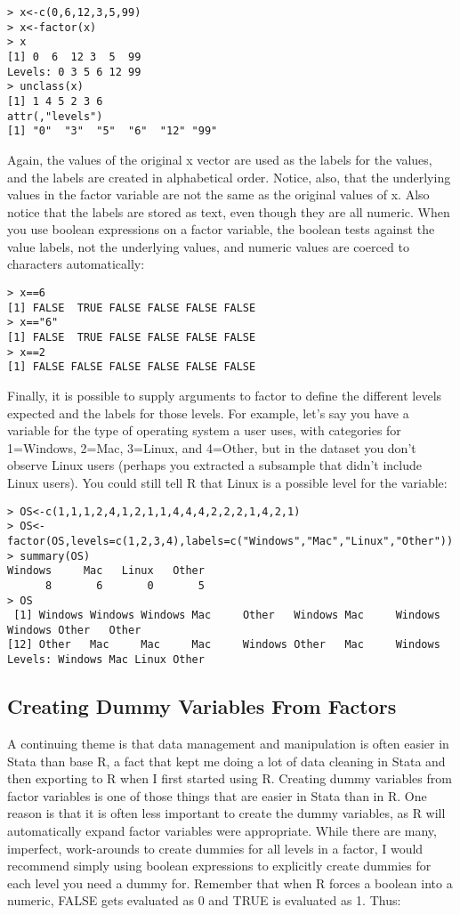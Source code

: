 \documentclass[12pt, oneside]{amsart}   	%
\begin{document}
\begin{verbatim}
> x<-c(0,6,12,3,5,99)
> x<-factor(x)
> x
[1] 0  6  12 3  5  99
Levels: 0 3 5 6 12 99
> unclass(x)
[1] 1 4 5 2 3 6
attr(,"levels")
[1] "0"  "3"  "5"  "6"  "12" "99"
\end{verbatim}

Again, the values of the original x vector are used as the labels for the values, and the labels are created in alphabetical order. Notice, also, that the underlying values in the factor variable are not the same as the original values of x. Also notice that the labels are stored as text, even though they are all numeric. When you use boolean expressions on a factor variable, the boolean tests against the value labels, not the underlying values, and numeric values are coerced to characters automatically:

\begin{verbatim}
> x==6
[1] FALSE  TRUE FALSE FALSE FALSE FALSE
> x=="6"
[1] FALSE  TRUE FALSE FALSE FALSE FALSE
> x==2
[1] FALSE FALSE FALSE FALSE FALSE FALSE
\end{verbatim}

Finally, it is possible to supply arguments to factor to define the different levels expected and the labels for those levels. For example, let's say you have a variable for the type of operating system a user uses, with categories for 1=Windows, 2=Mac, 3=Linux, and 4=Other, but in the dataset you don't observe Linux users (perhaps you extracted a subsample that didn't include Linux users). You could still tell R that Linux is a possible level for the variable:

\begin{verbatim}
> OS<-c(1,1,1,2,4,1,2,1,1,4,4,4,2,2,2,1,4,2,1)
> OS<-factor(OS,levels=c(1,2,3,4),labels=c("Windows","Mac","Linux","Other"))
> summary(OS)
Windows     Mac   Linux   Other 
      8       6       0       5 
> OS
 [1] Windows Windows Windows Mac     Other   Windows Mac     Windows Windows Other   Other  
[12] Other   Mac     Mac     Mac     Windows Other   Mac     Windows
Levels: Windows Mac Linux Other
\end{verbatim}

\subsection{Creating Dummy Variables From Factors}

A continuing theme is that data management and manipulation is often easier in Stata than base R, a fact that kept me doing a lot of data cleaning in Stata and then exporting to R when I first started using R. Creating dummy variables from factor variables is one of those things that are easier in Stata than in R. One reason is that it is often less important to create the dummy variables, as R will automatically expand factor variables were appropriate. While there are many, imperfect, work-arounds to create dummies for all levels in a factor, I would recommend simply using boolean expressions to explicitly create dummies for each level you need a dummy for. Remember that when R forces a boolean into a numeric, FALSE gets evaluated as 0 and TRUE is evaluated as 1. Thus:
\end{document}
